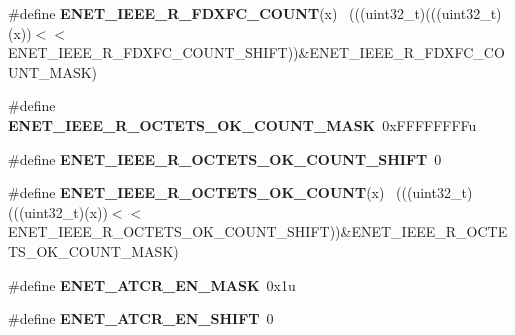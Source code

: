 \begin{DoxyCompactItemize}
\item 
\hypertarget{group___e_n_e_t___register___masks_ga8b425c43f53fd447d32861e06be61a2e}{}\#define {\bfseries E\+N\+E\+T\+\_\+\+I\+E\+E\+E\+\_\+\+R\+\_\+\+F\+D\+X\+F\+C\+\_\+\+C\+O\+U\+N\+T}(x)                          ~(((uint32\+\_\+t)(((uint32\+\_\+t)(x))$<$$<$E\+N\+E\+T\+\_\+\+I\+E\+E\+E\+\_\+\+R\+\_\+\+F\+D\+X\+F\+C\+\_\+\+C\+O\+U\+N\+T\+\_\+\+S\+H\+I\+F\+T))\&E\+N\+E\+T\+\_\+\+I\+E\+E\+E\+\_\+\+R\+\_\+\+F\+D\+X\+F\+C\+\_\+\+C\+O\+U\+N\+T\+\_\+\+M\+A\+S\+K)\label{group___e_n_e_t___register___masks_ga8b425c43f53fd447d32861e06be61a2e}

\item 
\hypertarget{group___e_n_e_t___register___masks_gab0a6815c67b330a4261dae4a7da445b5}{}\#define {\bfseries E\+N\+E\+T\+\_\+\+I\+E\+E\+E\+\_\+\+R\+\_\+\+O\+C\+T\+E\+T\+S\+\_\+\+O\+K\+\_\+\+C\+O\+U\+N\+T\+\_\+\+M\+A\+S\+K}~0x\+F\+F\+F\+F\+F\+F\+F\+Fu\label{group___e_n_e_t___register___masks_gab0a6815c67b330a4261dae4a7da445b5}

\item 
\hypertarget{group___e_n_e_t___register___masks_ga8a406cf6c9e91cc4a0217bd3f885ab05}{}\#define {\bfseries E\+N\+E\+T\+\_\+\+I\+E\+E\+E\+\_\+\+R\+\_\+\+O\+C\+T\+E\+T\+S\+\_\+\+O\+K\+\_\+\+C\+O\+U\+N\+T\+\_\+\+S\+H\+I\+F\+T}~0\label{group___e_n_e_t___register___masks_ga8a406cf6c9e91cc4a0217bd3f885ab05}

\item 
\hypertarget{group___e_n_e_t___register___masks_ga42d753b07e3c69f0bb3439c4ff00fb04}{}\#define {\bfseries E\+N\+E\+T\+\_\+\+I\+E\+E\+E\+\_\+\+R\+\_\+\+O\+C\+T\+E\+T\+S\+\_\+\+O\+K\+\_\+\+C\+O\+U\+N\+T}(x)                  ~(((uint32\+\_\+t)(((uint32\+\_\+t)(x))$<$$<$E\+N\+E\+T\+\_\+\+I\+E\+E\+E\+\_\+\+R\+\_\+\+O\+C\+T\+E\+T\+S\+\_\+\+O\+K\+\_\+\+C\+O\+U\+N\+T\+\_\+\+S\+H\+I\+F\+T))\&E\+N\+E\+T\+\_\+\+I\+E\+E\+E\+\_\+\+R\+\_\+\+O\+C\+T\+E\+T\+S\+\_\+\+O\+K\+\_\+\+C\+O\+U\+N\+T\+\_\+\+M\+A\+S\+K)\label{group___e_n_e_t___register___masks_ga42d753b07e3c69f0bb3439c4ff00fb04}

\item 
\hypertarget{group___e_n_e_t___register___masks_gad410926040b6756be05d2278d21dea59}{}\#define {\bfseries E\+N\+E\+T\+\_\+\+A\+T\+C\+R\+\_\+\+E\+N\+\_\+\+M\+A\+S\+K}~0x1u\label{group___e_n_e_t___register___masks_gad410926040b6756be05d2278d21dea59}

\item 
\hypertarget{group___e_n_e_t___register___masks_gaf76be9f51320e23fe6b987d73a2b167b}{}\#define {\bfseries E\+N\+E\+T\+\_\+\+A\+T\+C\+R\+\_\+\+E\+N\+\_\+\+S\+H\+I\+F\+T}~0\label{group___e_n_e_t___register___masks_gaf76be9f51320e23fe6b987d73a2b167b}


\end{DoxyCompactItemize}
